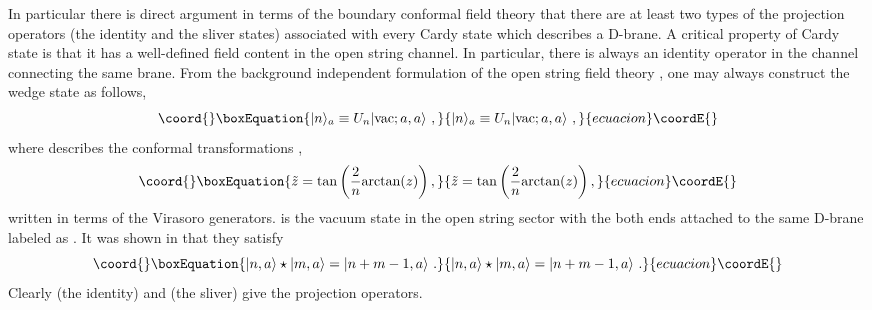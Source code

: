\documentclass[a4paper,12pt]{article}
\begin{document}
In particular there is direct argument \cite{r-RSZ4, r-Matsuo1}
in terms of the boundary conformal field theory that 
there are at least two types of the projection operators 
(the identity and the sliver states) associated with
every Cardy state which describes a D-brane. 
A critical property of Cardy state is that it has
a well-defined field content in the open string channel.
In particular, there is always an identity operator in the
channel connecting the same brane.
From the background independent formulation of the
open string field theory \cite{r-RZ}, one may always construct
the wedge state as follows,
\begin{equation}\coord{}\boxEquation{
 |n\rangle_a \equiv U_n|\mbox{vac};a,a\rangle\,\,,
}{
 |n\rangle_a \equiv U_n|\mbox{vac};a,a\rangle\,\,,
}{ecuacion}\coordE{}\end{equation}
where \coordHE{} describes the conformal transformations 
\cite{r-RZ, r-RSZ4},
\begin{equation}\coord{}\boxEquation{
 \tilde{z}=\tan\left(\frac{2}{n}\mbox{arctan}(z)\right),
}{
 \tilde{z}=\tan\left(\frac{2}{n}\mbox{arctan}(z)\right),
}{ecuacion}\coordE{}\end{equation}
written in terms of the Virasoro generators.
\coordHE{} is the vacuum state
in the open string sector with the both ends attached
to the same D-brane labeled as \coordHE{}. It was shown in \cite{r-RZ}
that they satisfy
\begin{equation}\coord{}\boxEquation{
 |n,a\rangle \star |m, a\rangle = |n+m-1,a\rangle\,\,.
}{
 |n,a\rangle \star |m, a\rangle = |n+m-1,a\rangle\,\,.
}{ecuacion}\coordE{}\end{equation}
Clearly \coordHE{} (the identity) and
\coordHE{} (the sliver) give the projection operators.
\end{document}
